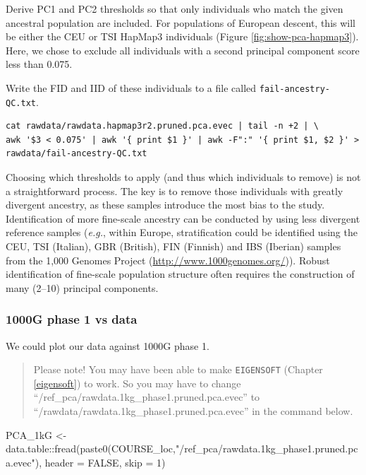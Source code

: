 \documentclass[
]{book}
\newenvironment{Shaded}{\begin{snugshade}}{\end{snugshade}}
\newcommand{\AttributeTok}[1]{\textcolor[rgb]{0.77,0.63,0.00}{#1}}
\newcommand{\ConstantTok}[1]{\textcolor[rgb]{0.00,0.00,0.00}{#1}}
\newcommand{\DecValTok}[1]{\textcolor[rgb]{0.00,0.00,0.81}{#1}}
\newcommand{\FunctionTok}[1]{\textcolor[rgb]{0.00,0.00,0.00}{#1}}
\newcommand{\NormalTok}[1]{#1}
\newcommand{\OtherTok}[1]{\textcolor[rgb]{0.56,0.35,0.01}{#1}}
\newcommand{\SpecialCharTok}[1]{\textcolor[rgb]{0.00,0.00,0.00}{#1}}
\newcommand{\StringTok}[1]{\textcolor[rgb]{0.31,0.60,0.02}{#1}}
\begin{document}
Derive PC1 and PC2 thresholds so that only individuals who match the given ancestral population are included. For populations of European descent, this will be either the CEU or TSI HapMap3 individuals (Figure \ref{fig:show-pca-hapmap3}). Here, we chose to exclude all individuals with a second principal component score less than 0.075.

Write the FID and IID of these individuals to a file called \texttt{fail-ancestry-QC.txt}.

\begin{verbatim}
cat rawdata/rawdata.hapmap3r2.pruned.pca.evec | tail -n +2 | \
awk '$3 < 0.075' | awk '{ print $1 }' | awk -F":" '{ print $1, $2 }' > rawdata/fail-ancestry-QC.txt
\end{verbatim}

Choosing which thresholds to apply (and thus which individuals to remove) is not a straightforward process. The key is to remove those individuals with greatly divergent ancestry, as these samples introduce the most bias to the study. Identification of more fine-scale ancestry can be conducted by using less divergent reference samples (\emph{e.g.}, within Europe, stratification could be identified using the CEU, TSI (Italian), GBR (British), FIN (Finnish) and IBS (Iberian) samples from the 1,000 Genomes Project (\url{http://www.1000genomes.org/})). Robust identification of fine-scale population structure often requires the construction of many (2--10) principal components.

\hypertarget{g-phase-1-vs-data-1}{%
\subsubsection{1000G phase 1 vs data}\label{g-phase-1-vs-data-1}}

We could plot our data against 1000G phase 1.

\begin{quote}
Please note! You may have been able to make \texttt{EIGENSOFT} (Chapter \ref{eigensoft}) to work. So you may have to change ``/ref\_pca/rawdata.1kg\_phase1.pruned.pca.evec'' to ``/rawdata/rawdata.1kg\_phase1.pruned.pca.evec'' in the command below.
\end{quote}

\begin{Shaded}
\begin{Highlighting}[]
\NormalTok{PCA\_1kG }\OtherTok{\textless{}{-}}\NormalTok{ data.table}\SpecialCharTok{::}\FunctionTok{fread}\NormalTok{(}\FunctionTok{paste0}\NormalTok{(COURSE\_loc,}\StringTok{"/ref\_pca/rawdata.1kg\_phase1.pruned.pca.evec"}\NormalTok{), }\AttributeTok{header =} \ConstantTok{FALSE}\NormalTok{, }\AttributeTok{skip =} \DecValTok{1}\NormalTok{)}
\end{Highlighting}
\end{Shaded}
\end{document}
